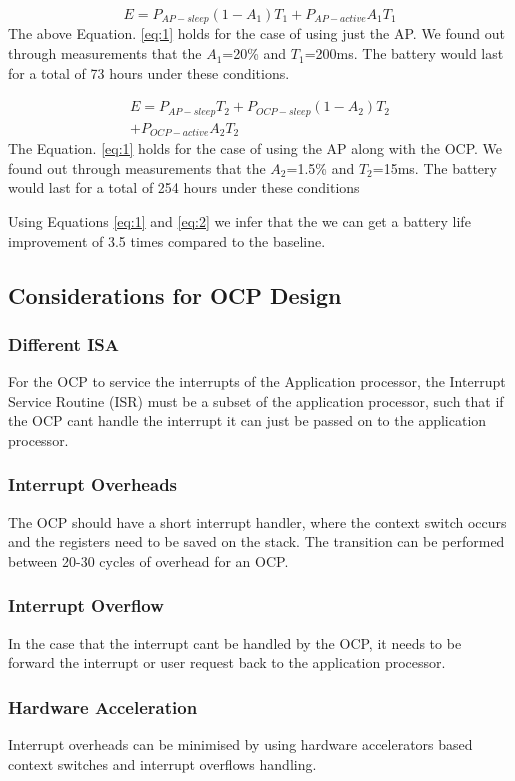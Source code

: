 \documentclass[conference]{IEEEtran}
\begin{document}
\begin{equation} \label{eq:1}
    E = P_{AP-sleep}(1-A_1)T_1 + P_{AP-active}A_1T_1
\end{equation}
The above Equation. \ref{eq:1} holds for the case of using just the AP. We found out through measurements that the $A_1$=20\% and $T_1$=200ms. The battery would last for a total of 73 hours under these conditions.

\begin{multline} \label{eq:2}
    E = P_{AP-sleep}T_2 + P_{OCP-sleep}(1-A_2)T_2 \\
    + P_{OCP-active}A_2T_2
\end{multline}
The Equation. \ref{eq:1} holds for the case of using the AP along with the OCP. We found out through measurements that the $A_2$=1.5\% and $T_2$=15ms. The battery would last for a total of 254 hours under these conditions

Using Equations \ref{eq:1} and \ref{eq:2} we infer that the we can get a battery life improvement of 3.5 times compared to the baseline.
\subsection{Considerations for OCP Design}
\subsubsection{Different ISA}
For the OCP to service the interrupts of the Application processor, the
Interrupt Service Routine (ISR) must be a subset of the application processor,
such that if the OCP cant handle the interrupt it can just be passed on to the
application processor.
\subsubsection{Interrupt Overheads}
The OCP should have a short interrupt handler, where the context switch
occurs and the registers need to be saved on the stack. The transition can be
performed between 20-30 cycles of overhead for an OCP.
\subsubsection{Interrupt Overflow}
In the case that the interrupt cant be handled by the OCP, it needs to be
forward the interrupt or user request back to the application processor.
\subsubsection{Hardware Acceleration}
Interrupt overheads can be minimised by using hardware accelerators based
context switches and interrupt overflows handling.
\end{document}

